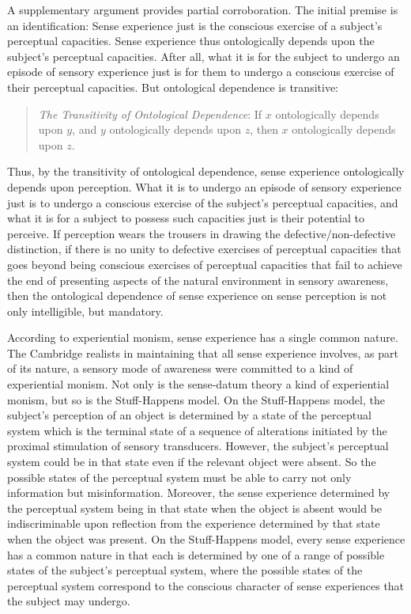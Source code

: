 \documentclass[12pt]{article}
\begin{document}
A supplementary argument provides partial corroboration. The initial premise is an identification: Sense experience just is the conscious exercise of a subject's perceptual capacities. Sense experience thus ontologically depends upon the subject's perceptual capacities. After all, what it is for the subject to undergo an episode of sensory experience just is for them to undergo a conscious exercise of their perceptual capacities. But ontological dependence is transitive: 
\begin{quote}
	\emph{The Transitivity of Ontological Dependence}: If \( x \) ontologically depends upon \( y \), and \( y \) ontologically depends upon \( z \), then \( x \) ontologically depends upon \( z \). 
\end{quote}
Thus, by the transitivity of ontological dependence, sense experience ontologically depends upon perception. What it is to undergo an episode of sensory experience just is to undergo a conscious exercise of the subject's perceptual capacities, and what it is for a subject to possess such capacities just is their potential to perceive. If perception wears the trousers in drawing the defective/non-defective distinction, if there is no unity to defective exercises of perceptual capacities that goes beyond being conscious exercises of perceptual capacities that fail to achieve the end of presenting aspects of the natural environment in sensory awareness, then the ontological dependence of sense experience on sense perception is not only intelligible, but mandatory.

According to experiential monism, sense experience has a single common nature. The Cambridge realists in maintaining that all sense experience involves, as part of its nature, a sensory mode of awareness were committed to a kind of experiential monism. Not only is the sense-datum theory a kind of experiential monism, but so is the Stuff-Happens model. On the Stuff-Happens model, the subject's perception of an object is determined by a state of the perceptual system which is the terminal state of a sequence of alterations initiated by the proximal stimulation of sensory transducers. However, the subject's perceptual system could be in that state even if the relevant object were absent. So the possible states of the perceptual system must be able to carry not only information but misinformation. Moreover, the sense experience determined by the perceptual system being in that state when the object is absent would be indiscriminable upon reflection from the experience determined by that state when the object was present. On the Stuff-Happens model, every sense experience has a common nature in that each is determined by one of a range of possible states of the subject's perceptual system, where the possible states of the perceptual system correspond to the conscious character of sense experiences that the subject may undergo.
\end{document}
